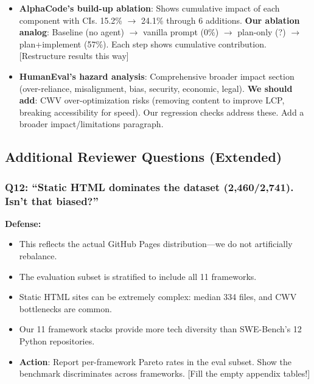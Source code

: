 \begin{itemize}
    \item \textbf{AlphaCode's build-up ablation}: Shows cumulative impact of each component with CIs. 15.2\% $\rightarrow$ 24.1\% through 6 additions. \textbf{Our ablation analog}: Baseline (no agent) $\rightarrow$ vanilla prompt (0\%) $\rightarrow$ plan-only (?) $\rightarrow$ plan+implement (57\%). Each step shows cumulative contribution. [Restructure results this way]
    \item \textbf{HumanEval's hazard analysis}: Comprehensive broader impact section (over-reliance, misalignment, bias, security, economic, legal). \textbf{We should add}: CWV over-optimization risks (removing content to improve LCP, breaking accessibility for speed). Our regression checks address these. Add a broader impact/limitations paragraph.
\end{itemize}


\subsection{Additional Reviewer Questions (Extended)}

\subsubsection{Q12: ``Static HTML dominates the dataset (2,460/2,741). Isn't that biased?''}
\textbf{Defense:}
\begin{itemize}
    \item This reflects the actual GitHub Pages distribution---we do not artificially rebalance.
    \item The evaluation subset is stratified to include all 11 frameworks.
    \item Static HTML sites can be extremely complex: median 334 files, and CWV bottlenecks are common.
    \item Our 11 framework stacks provide more tech diversity than SWE-Bench's 12 Python repositories.
    \item \textbf{Action}: Report per-framework Pareto rates in the eval subset. Show the benchmark discriminates across frameworks. [Fill the empty appendix tables!]
\end{itemize}

